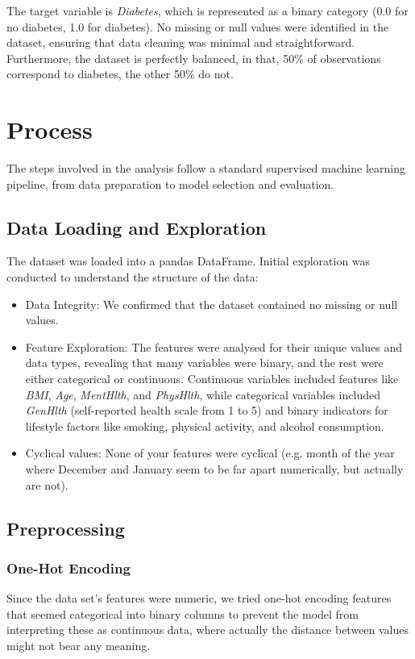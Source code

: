 \documentclass[a4paper,12pt]{article}
\begin{document}
The target variable is \textit{Diabetes}, which is represented as a binary category 
(0.0 for no diabetes, 1.0 for diabetes). No missing or null values were identified in the dataset, 
ensuring that data cleaning was minimal and straightforward. Furthermore, the dataset is perfectly 
balanced, in that, 50\% of observations correspond to diabetes, the other 50\% do not.


\section{Process}
The steps involved in the analysis follow a standard supervised machine learning pipeline, 
from data preparation to model selection and evaluation.


\subsection{Data Loading and Exploration}
The dataset was loaded into a pandas DataFrame. Initial exploration was conducted to understand 
the structure of the data:
\begin{itemize}
    \item Data Integrity: We confirmed that the dataset contained no missing or null values.
    \item Feature Exploration: The features were analysed for their unique values and data 
    types, revealing that many variables were binary, and the rest were either categorical or 
    continuous. Continuous variables included features like \textit{BMI}, \textit{Age}, \textit{MentHlth}, 
    and \textit{PhysHlth}, while categorical variables included \textit{GenHlth} 
    (self-reported health scale from 1 to 5) and binary indicators for lifestyle factors like 
    smoking, physical activity, and alcohol consumption.
    \item Cyclical values: None of your features were cyclical (e.g. month of the year where December and 
    January seem to be far apart numerically, but actually are not).
\end{itemize}

\subsection{Preprocessing}
\subsubsection{One-Hot Encoding}
Since the data set's features were numeric, we tried one-hot encoding features that seemed categorical
into binary columns to prevent the model from interpreting these as continuous data, where actually
the distance between values might not bear any meaning. 
\end{document}
